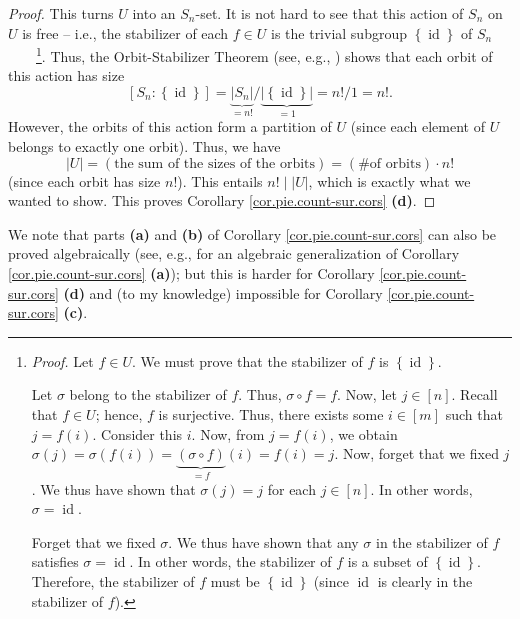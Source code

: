 \begin{proof}
This turns $U$ into an $S_{n}$-set. It is not hard to see that this action of
$S_{n}$ on $U$ is free -- i.e., the stabilizer of each $f\in U$ is the trivial
subgroup $\left\{  \operatorname*{id}\right\}  $ of $S_{n}$%
\ \ \ \ \footnote{\textit{Proof.} Let $f\in U$. We must prove that the
stabilizer of $f$ is $\left\{  \operatorname*{id}\right\}  $.
\par
Let $\sigma$ belong to the stabilizer of $f$. Thus, $\sigma\circ f=f$. Now,
let $j\in\left[  n\right]  $. Recall that $f\in U$; hence, $f$ is surjective.
Thus, there exists some $i\in\left[  m\right]  $ such that $j=f\left(
i\right)  $. Consider this $i$. Now, from $j=f\left(  i\right)  $, we obtain
$\sigma\left(  j\right)  =\sigma\left(  f\left(  i\right)  \right)
=\underbrace{\left(  \sigma\circ f\right)  }_{=f}\left(  i\right)  =f\left(
i\right)  =j$. Now, forget that we fixed $j$. We thus have shown that
$\sigma\left(  j\right)  =j$ for each $j\in\left[  n\right]  $. In other
words, $\sigma=\operatorname*{id}$.
\par
Forget that we fixed $\sigma$. We thus have shown that any $\sigma$ in the
stabilizer of $f$ satisfies $\sigma=\operatorname*{id}$. In other words, the
stabilizer of $f$ is a subset of $\left\{  \operatorname*{id}\right\}  $.
Therefore, the stabilizer of $f$ must be $\left\{  \operatorname*{id}\right\}
$ (since $\operatorname*{id}$ is clearly in the stabilizer of $f$).}. Thus,
the Orbit-Stabilizer Theorem (see, e.g., \cite[Theorem 3.2.5]{Quinlan21})
shows that each orbit of this action has size%
\[
\left[  S_{n}:\left\{  \operatorname*{id}\right\}  \right]
=\underbrace{\left\vert S_{n}\right\vert }_{=n!}/\underbrace{\left\vert
\left\{  \operatorname*{id}\right\}  \right\vert }_{=1}=n!/1=n!.
\]
However, the orbits of this action form a partition of $U$ (since each element
of $U$ belongs to exactly one orbit). Thus, we have%
\[
\left\vert U\right\vert =\left(  \text{the sum of the sizes of the
orbits}\right)  =\left(  \text{\# of orbits}\right)  \cdot n!
\]
(since each orbit has size $n!$). This entails $n!\mid\left\vert U\right\vert
$, which is exactly what we wanted to show. This proves Corollary
\ref{cor.pie.count-sur.cors} \textbf{(d)}.
\end{proof}

We note that parts \textbf{(a)} and \textbf{(b)} of Corollary
\ref{cor.pie.count-sur.cors} can also be proved algebraically (see, e.g.,
\cite[Exercise 5.4.2 \textbf{(d)}]{20f} for an algebraic generalization of
Corollary \ref{cor.pie.count-sur.cors} \textbf{(a)}); but this is harder for
Corollary \ref{cor.pie.count-sur.cors} \textbf{(d)} and (to my knowledge)
impossible for Corollary \ref{cor.pie.count-sur.cors} \textbf{(c)}.


